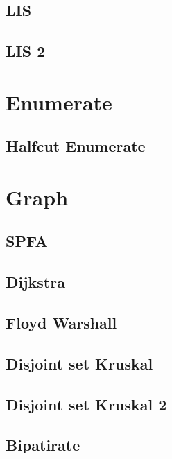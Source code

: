         \subsection{LIS}
                  
        \subsection{LIS 2}
                  

\section{Enumerate} 
        \subsection{Halfcut Enumerate}
                

\section{Graph}
        \subsection{SPFA}
                
        \subsection{Dijkstra}
                
        \subsection{Floyd Warshall}
                
        \subsection{Disjoint set Kruskal}
                
        \subsection{Disjoint set Kruskal 2}
                
        \subsection{Bipatirate}
                
